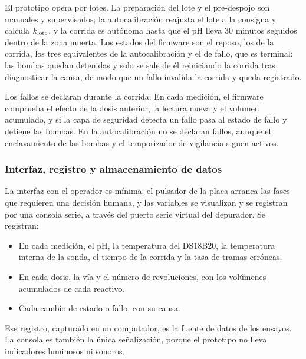 El prototipo opera por lotes. La preparación del lote y el pre-despojo son manuales y supervisados; la autocalibración reajusta el lote a la consigna y calcula $k_{\text{lote}}$, y la corrida es autónoma hasta que el pH lleva 30 minutos seguidos dentro de la zona muerta. Los estados del firmware son el reposo, los de la corrida, los tres equivalentes de la autocalibración y el de fallo, que es terminal: las bombas quedan detenidas y solo se sale de él reiniciando la corrida tras diagnosticar la causa, de modo que un fallo invalida la corrida y queda registrado.

Los fallos se declaran durante la corrida. En cada medición, el firmware comprueba el efecto de la dosis anterior, la lectura nueva y el volumen acumulado, y si la capa de seguridad detecta un fallo pasa al estado de fallo y detiene las bombas. En la autocalibración no se declaran fallos, aunque el enclavamiento de las bombas y el temporizador de vigilancia siguen activos.


\subsubsection{Interfaz, registro y almacenamiento de datos}\label{sec:registro}
La interfaz con el operador es mínima: el pulsador de la placa arranca las fases que requieren una decisión humana, y las variables se visualizan y se registran por una consola serie, a través del puerto serie virtual del depurador. Se registran:
\begin{itemize}
\item En cada medición, el pH, la temperatura del DS18B20, la temperatura interna de la sonda, el tiempo de la corrida y la tasa de tramas erróneas.
\item En cada dosis, la vía y el número de revoluciones, con los volúmenes acumulados de cada reactivo.
\item Cada cambio de estado o fallo, con su causa.
\end{itemize}
Ese registro, capturado en un computador, es la fuente de datos de los ensayos. La consola es también la única señalización, porque el prototipo no lleva indicadores luminosos ni sonoros.

